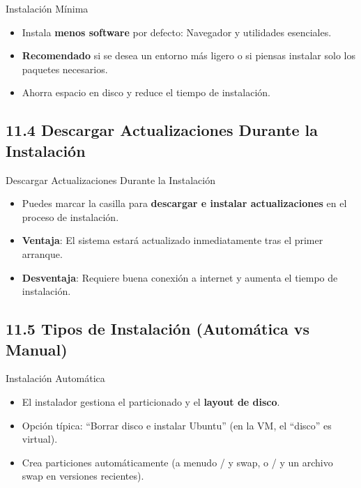 \documentclass{beamer}
\begin{document}
\begin{frame}{Instalación Mínima}
    \begin{itemize}
        \item Instala \textbf{menos software} por defecto: Navegador y utilidades esenciales.
        \item \textbf{Recomendado} si se desea un entorno más ligero o si piensas instalar solo los paquetes necesarios.
        \item Ahorra espacio en disco y reduce el tiempo de instalación.
    \end{itemize}
\end{frame}

\subsection{11.4 Descargar Actualizaciones Durante la Instalación}
\begin{frame}{Descargar Actualizaciones Durante la Instalación}
    \begin{itemize}
        \item Puedes marcar la casilla para \textbf{descargar e instalar actualizaciones} en el proceso de instalación.
        \item \textbf{Ventaja}: El sistema estará actualizado inmediatamente tras el primer arranque.
        \item \textbf{Desventaja}: Requiere buena conexión a internet y aumenta el tiempo de instalación.
    \end{itemize}
\end{frame}

\subsection{11.5 Tipos de Instalación (Automática vs Manual)}
\begin{frame}{Instalación Automática}
    \begin{itemize}
        \item El instalador gestiona el particionado y el \textbf{layout de disco}.
        \item Opción típica: “Borrar disco e instalar Ubuntu” (en la VM, el “disco” es virtual).
        \item Crea particiones automáticamente (a menudo / y swap, o / y un archivo swap en versiones recientes).
    \end{itemize}
\end{frame}
\end{document}
